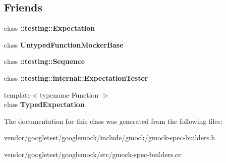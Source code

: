 \subsection*{Friends}
\begin{DoxyCompactItemize}
\item 
\mbox{\label{classtesting_1_1internal_1_1_expectation_base_a86fa3dccdc465d897ee321b74e4ce915}} 
class {\bfseries \+::testing\+::\+Expectation}
\item 
\mbox{\label{classtesting_1_1internal_1_1_expectation_base_a3e5598b244ec7673d0a494477d71e559}} 
class {\bfseries Untyped\+Function\+Mocker\+Base}
\item 
\mbox{\label{classtesting_1_1internal_1_1_expectation_base_aeaf43a487a21c0ac1135b094a1561056}} 
class {\bfseries \+::testing\+::\+Sequence}
\item 
\mbox{\label{classtesting_1_1internal_1_1_expectation_base_a83859ffda7f75bb8b447063eb53cb8b8}} 
class {\bfseries \+::testing\+::internal\+::\+Expectation\+Tester}
\item 
\mbox{\label{classtesting_1_1internal_1_1_expectation_base_a4f17de55396a8ef740d5ad2b1380a851}} 
{\footnotesize template$<$typename Function $>$ }\\class {\bfseries Typed\+Expectation}
\end{DoxyCompactItemize}


The documentation for this class was generated from the following files\+:\begin{DoxyCompactItemize}
\item 
vendor/googletest/googlemock/include/gmock/gmock-\/spec-\/builders.\+h\item 
vendor/googletest/googlemock/src/gmock-\/spec-\/builders.\+cc\end{DoxyCompactItemize}
